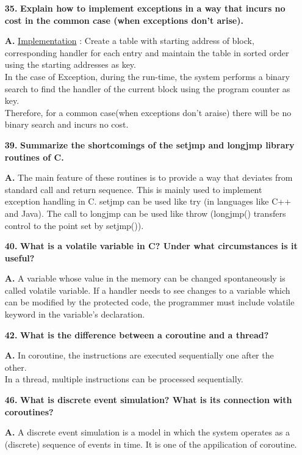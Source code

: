 \documentclass[letterpaper]{article}
\begin{document}
\begin{large}
\begin{flushleft}
\begin{enumerate}
\item[\textbf{35.}]
\textbf{Explain how to implement exceptions in a way that incurs no cost in the common case (when exceptions don’t arise).}
\item[\textbf{A.}]
\underline{Implementation} : Create a table with starting address of block, corresponding handler for each entry and maintain the table in sorted order using the starting addresses as key.\\
In the case of Exception, during the run-time, the system performs a binary search to find the handler of the current block using the program counter as key.\\
Therefore, for a common case(when exceptions don't araise) there will be no binary search and incurs no cost.

\item[\textbf{39.}]
\textbf{Summarize the shortcomings of the setjmp and longjmp library routines
of C.}
\item[\textbf{A.}]
The main feature of these routines is to provide a way that deviates from standard call and return sequence. This is mainly used to implement exception handling in C. setjmp can be used like try (in languages like C++ and Java). The call to longjmp can be used like throw (longjmp() transfers control to the point set by setjmp()).

\item[\textbf{40.}]
\textbf{What is a volatile variable in C? Under what circumstances is it useful?}
\item[\textbf{A.}]
A variable whose value in the memory can be changed spontaneously is called volatile variable. If a handler needs to see changes to a variable which can be modified by the protected code, the programmer must include volatile keyword in the variable's declaration. 

\item[\textbf{42.}]
\textbf{What is the difference between a coroutine and a thread?}
\item[\textbf{A.}]
In coroutine, the instructions are executed sequentially one after the other.\\
In a thread, multiple instructions can be processed sequentially.
 
\item[\textbf{46.}]
\textbf{What is discrete event simulation? What is its connection with coroutines?}
\item[\textbf{A.}]
A discrete event simulation is a model in which the system operates as a (discrete) sequence of events in time. It is one of the appilication of coroutine.


\end{enumerate}
\end{flushleft}
\end{large}
\end{document}
